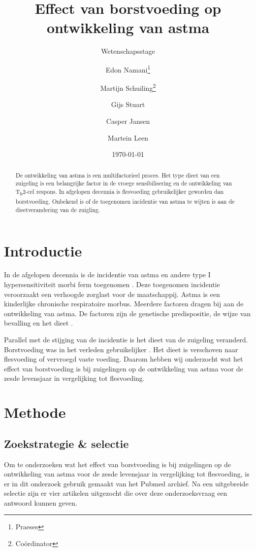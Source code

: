 \documentclass[abstract=true]{scrartcl}
\title{Effect van borstvoeding op ontwikkeling van astma}
\subtitle{Wetenschapsstage}
\author{Edon Namani\thanks{Praeses} \and Martijn Schuiling\thanks{Co\"ordinator} \and Gijs Stuart \and Casper Jansen \and Martein Leen}
\date{\today}
\begin{document}
\maketitle
    \begin{abstract}
        De ontwikkeling van astma is een multifactorieel proces. Het type dieet van een zuigeling is een belangrijke factor in de vroege sensibilisering en de ontwikkeling van T\textsubscript{h}2-cel respons. In afgelopen decennia is flesvoeding gebruikelijker geworden dan borstvoeding. Onbekend is of de toegenomen incidentie van astma te wijten is aan de dieetverandering van de zuigling.
    \end{abstract}

\section{Introductie}
In de afgelopen decennia is de incidentie van astma en andere type I hypersensitiviteit morbi ferm toegenomen \cite{Platts_Mills_2015}. Deze toegenomen incidentie veroorzaakt een verhoogde zorglast voor de maatschappij. Astma is een kinderlijke chronische respiratoire morbus. Meerdere factoren dragen bij aan de ontwikkeling van astma. De factoren zijn de genetische predispositie, de wijze van bevalling en het dieet \cite{abbas2017cellular,Houghteling_2015}.

Parallel met de stijging van de incidentie is het dieet van de zuigeling veranderd. Borstvoeding was in het verleden gebruikelijker \cite{world1981contemporary,Victora_2016,Rollins_2016}. Het dieet is verschoven naar flesvoeding of vervroegd vaste voeding. Daarom hebben wij onderzocht wat het effect van borstvoeding is bij zuigelingen op de ontwikkeling van astma voor de zesde levensjaar in vergelijking tot flesvoeding.


\section{Methode}
    \subsection{Zoekstrategie \& selectie}
    Om te onderzoeken wat het effect van borstvoeding is bij zuigelingen op de ontwikkeling van astma voor de zesde levensjaar in vergelijking tot flesvoeding, is er in dit onderzoek gebruik gemaakt van het Pubmed archief. Na een uitgebreide selectie zijn er vier artikelen uitgezocht die over deze onderzoeksvraag een antwoord kunnen geven.\hfil
\end{document}
